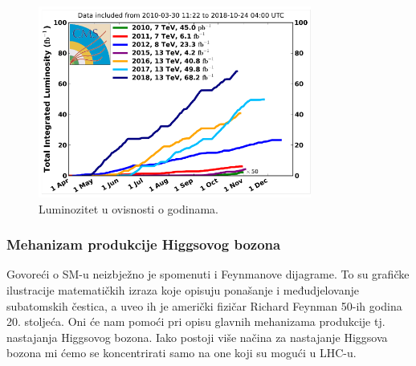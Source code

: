 \documentclass[12pt,a4paper,oneside]{article}
\begin{document}
\begin{linenumbers}
			\begin{figure}[h!]
			\centering
			\includegraphics[width=0.8\textwidth]{luminozitet.png}
			\caption[Saturn viđen u ultraljubičastom svjetlu.]{\label{sl:luminozitet}Luminozitet u ovisnosti o godinama. }
		\end{figure}
		\subsubsection{Mehanizam produkcije Higgsovog bozona}
		Govoreći o SM-u neizbježno je spomenuti i Feynmanove dijagrame. To su grafičke ilustracije matematičkih izraza koje opisuju ponašanje i međudjelovanje subatomskih čestica, a uveo ih je američki fizičar Richard Feynman 50-ih godina 20. stoljeća. Oni će nam pomoći pri opisu glavnih mehanizama produkcije tj. nastajanja Higgsovog bozona. Iako postoji više načina za nastajanje Higgsova bozona mi ćemo se koncentrirati samo na one koji su mogući u LHC-u.~\cite{doktorat}
		

\end{linenumbers}
\end{document}
